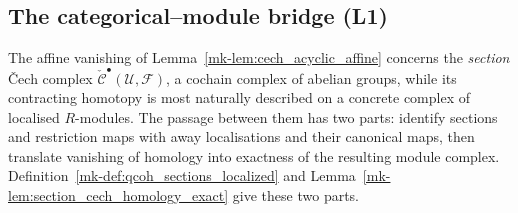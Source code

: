 \subsection{The categorical--module bridge (L1)}
\label{mk-sec:cech_l1_bridge}

The affine vanishing of Lemma~\ref{mk-lem:cech_acyclic_affine} concerns the
\emph{section} {\v C}ech complex \(\check{\mathcal{C}}^\bullet(\mathcal{U},
\mathcal{F})\), a cochain complex of abelian groups, while its contracting homotopy is
most naturally described on a concrete complex of localised \(R\)-modules. The
passage between them has two parts: identify sections and restriction maps with away
localisations and their canonical maps, then translate vanishing of homology into
exactness of the resulting module complex. Definition~\ref{mk-def:qcoh_sections_localized}
and Lemma~\ref{mk-lem:section_cech_homology_exact} give these two parts.

